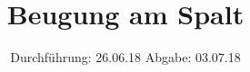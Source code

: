 
\setlength{\parindent}{0em}

\subject{V406}
\title{Beugung am Spalt}
\date{%
  Durchführung: 26.06.18
  \hspace{3em}
  Abgabe: 03.07.18
}



\maketitle
\thispagestyle{empty}
\tableofcontents
\newpage
\setlength{\parindent}{0em}







\printbibliography{}


